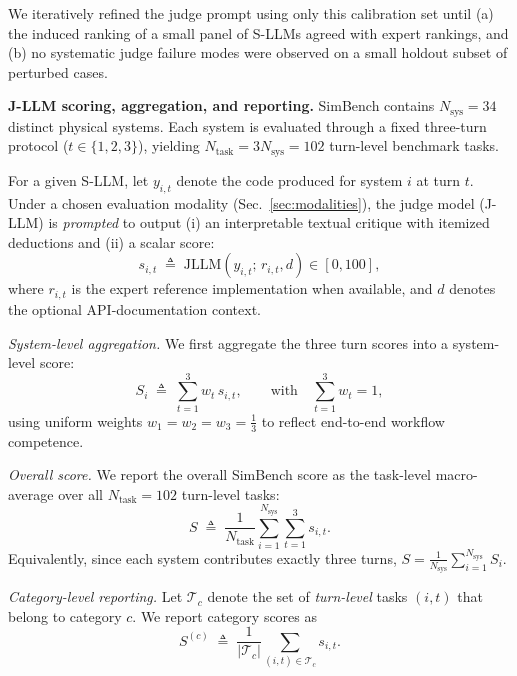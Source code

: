 \documentclass{ieeeaccess}
\begin{document}
We iteratively refined the judge prompt using only this calibration set until (a) the induced ranking of a small panel of S-LLMs agreed with expert rankings, and (b) no systematic judge failure modes were observed on a small holdout subset of perturbed cases.

\medskip

\noindent\textbf{J-LLM scoring, aggregation, and reporting.}
SimBench contains $N_{\text{sys}}=34$ distinct physical systems. Each system is evaluated through a fixed three-turn protocol ($t\in\{1,2,3\}$), yielding $N_{\text{task}}=3N_{\text{sys}}=102$ turn-level benchmark tasks.

For a given S-LLM, let $y_{i,t}$ denote the code produced for system $i$ at turn $t$. Under a chosen evaluation modality (Sec.~\ref{sec:modalities}), the judge model (J-LLM) is \emph{prompted} to output (i) an interpretable textual critique with itemized deductions and (ii) a scalar score:
\begin{equation}
s_{i,t} \;\triangleq\; \mathrm{JLLM}\!\left(y_{i,t};\, r_{i,t}, d\right)\in[0,100],
\end{equation}
where $r_{i,t}$ is the expert reference implementation when available, and $d$ denotes the optional API-documentation context.

\vspace{2pt}
\noindent\emph{System-level aggregation.}
We first aggregate the three turn scores into a system-level score:
\begin{equation}
S_i \;\triangleq\; \sum_{t=1}^{3} w_t\, s_{i,t},
\qquad \text{with}\quad \sum_{t=1}^{3} w_t = 1,
\label{eq:sys_agg}
\end{equation}
using uniform weights $w_1=w_2=w_3=\tfrac{1}{3}$ to reflect end-to-end workflow competence.
\vspace{2pt}

\noindent\emph{Overall score.}
We report the overall SimBench score as the task-level macro-average over all $N_{\text{task}}=102$ turn-level tasks:
\begin{equation}
S \;\triangleq\; \frac{1}{N_{\text{task}}}\sum_{i=1}^{N_{\text{sys}}}\sum_{t=1}^{3} s_{i,t}.
\label{eq:overall_agg}
\end{equation}
Equivalently, since each system contributes exactly three turns, $S = \frac{1}{N_{\text{sys}}}\sum_{i=1}^{N_{\text{sys}}} S_i$.

\vspace{2pt}
\noindent\emph{Category-level reporting.}
Let $\mathcal{T}_c$ denote the set of \emph{turn-level} tasks $(i,t)$ that belong to category $c$. We report category scores as
\begin{equation}
S^{(c)} \;\triangleq\; \frac{1}{|\mathcal{T}_c|}\sum_{(i,t)\in\mathcal{T}_c} s_{i,t}.
\label{eq:cat_agg}
\end{equation}
\end{document}
